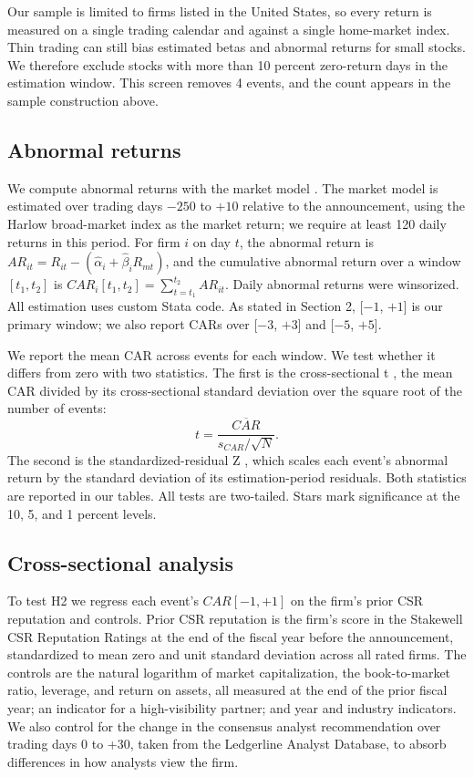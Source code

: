 \documentclass[11pt]{article}
\newcommand{\win}[2]{[$#1$, $#2$]}
\begin{document}
Our sample is limited to firms listed in the United States, so every return is measured on a single trading calendar and against a single home-market index. Thin trading can still bias estimated betas and abnormal returns for small stocks. We therefore exclude stocks with more than 10 percent zero-return days in the estimation window. This screen removes 4 events, and the count appears in the sample construction above.

\subsection{Abnormal returns}

We compute abnormal returns with the market model \citep{brownwarner1985,mackinlay1997}. The market model is estimated over trading days $-250$ to $+10$ relative to the announcement, using the Harlow broad-market index as the market return; we require at least 120 daily returns in this period. For firm $i$ on day $t$, the abnormal return is $AR_{it} = R_{it} - (\hat\alpha_i + \hat\beta_i R_{mt})$, and the cumulative abnormal return over a window $[t_1, t_2]$ is $CAR_i[t_1, t_2] = \sum_{t=t_1}^{t_2} AR_{it}$. Daily abnormal returns were winsorized. All estimation uses custom Stata code. As stated in Section 2, \win{-1}{+1} is our primary window; we also report CARs over \win{-3}{+3} and \win{-5}{+5}.

We report the mean CAR across events for each window. We test whether it differs from zero with two statistics. The first is the cross-sectional t \citep{harringtonshrider2007}, the mean CAR divided by its cross-sectional standard deviation over the square root of the number of events:
\[
t = \frac{\overline{CAR}}{s_{CAR}/\sqrt{N}}.
\]
The second is the standardized-residual Z \citep{patell1976}, which scales each event's abnormal return by the standard deviation of its estimation-period residuals. Both statistics are reported in our tables. All tests are two-tailed. Stars mark significance at the 10, 5, and 1 percent levels.

\subsection{Cross-sectional analysis}

To test H2 we regress each event's $CAR[-1, +1]$ on the firm's prior CSR reputation and controls. Prior CSR reputation is the firm's score in the Stakewell CSR Reputation Ratings at the end of the fiscal year before the announcement, standardized to mean zero and unit standard deviation across all rated firms. The controls are the natural logarithm of market capitalization, the book-to-market ratio, leverage, and return on assets, all measured at the end of the prior fiscal year; an indicator for a high-visibility partner; and year and industry indicators. We also control for the change in the consensus analyst recommendation over trading days 0 to +30, taken from the Ledgerline Analyst Database, to absorb differences in how analysts view the firm.
\end{document}
